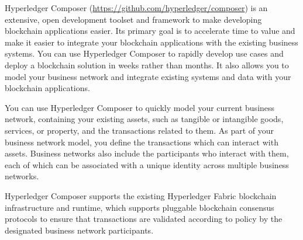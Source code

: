 Hyperledger Composer (\url{https://github.com/hyperledger/composer}) is an extensive, open development toolset and framework to make developing blockchain applications easier. Its primary goal is to accelerate time to value and make it easier to integrate your blockchain applications with the existing business systems. You can use Hyperledger Composer to rapidly develop use cases and deploy a blockchain solution in weeks rather than months. It also allows you to model your business network and integrate existing systems and data with your blockchain applications.

You can use Hyperledger Composer to quickly model your current business network, containing your existing assets, such as tangible or intangible goods, services, or property, and the transactions related to them. As part of your business network model, you define the transactions which can interact with assets. Business networks also include the participants who interact with them, each of which can be associated with a unique identity across multiple business networks.

Hyperledger Composer supports the existing Hyperledger Fabric blockchain infrastructure and runtime, which supports pluggable blockchain consensus protocols to ensure that transactions are validated according to policy by the designated business network participants.
